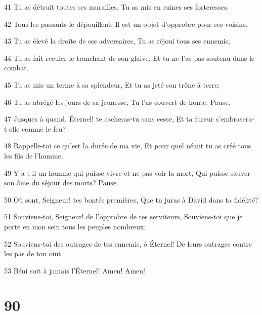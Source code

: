 \par 41 Tu as détruit toutes ses murailles, Tu as mis en ruines ses forteresses.
\par 42 Tous les passants le dépouillent; Il est un objet d'opprobre pour ses voisins.
\par 43 Tu as élevé la droite de ses adversaires, Tu as réjoui tous ses ennemis;
\par 44 Tu as fait reculer le tranchant de son glaive, Et tu ne l'as pas soutenu dans le combat.
\par 45 Tu as mis un terme à sa splendeur, Et tu as jeté son trône à terre;
\par 46 Tu as abrégé les jours de sa jeunesse, Tu l'as couvert de honte. Pause.
\par 47 Jusques à quand, Éternel! te cacheras-tu sans cesse, Et ta fureur s'embrasera-t-elle comme le feu?
\par 48 Rappelle-toi ce qu'est la durée de ma vie, Et pour quel néant tu as créé tous les fils de l'homme.
\par 49 Y a-t-il un homme qui puisse vivre et ne pas voir la mort, Qui puisse sauver son âme du séjour des morts? Pause.
\par 50 Où sont, Seigneur! tes bontés premières, Que tu juras à David dans ta fidélité?
\par 51 Souviens-toi, Seigneur! de l'opprobre de tes serviteurs, Souviens-toi que je porte en mon sein tous les peuples nombreux;
\par 52 Souviens-toi des outrages de tes ennemis, ô Éternel! De leurs outrages contre les pas de ton oint.
\par 53 Béni soit à jamais l'Éternel! Amen! Amen!

\chapter{90}

